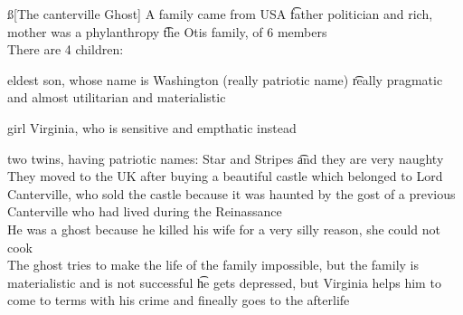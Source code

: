 \documentclass[12pt]{article}
\begin{document}
\ss[The canterville Ghost]
A family came from USA \t father politician and rich, mother was a phylanthropy \t the Otis family, of 6 members \\
There are 4 children: 
\bi
  \item eldest son, whose name is Washington (really patriotic name) \t really pragmatic and almost utilitarian and materialistic
  \item girl Virginia, who is sensitive and empthatic instead
  \item two twins, having patriotic names: Star and Stripes \t and they are very naughty
\ei
They moved to the UK after buying a beautiful castle which belonged to Lord Canterville, who sold the castle because it was haunted by the gost of a previous Canterville who had lived during the Reinassance \\
He was a ghost because he killed his wife for a very silly reason, she could not cook \\
The ghost tries to make the life of the family impossible, but the family is materialistic and is not successful \t he gets depressed, but Virginia helps him to come to terms with his crime and fineally goes to the afterlife
\end{document}
